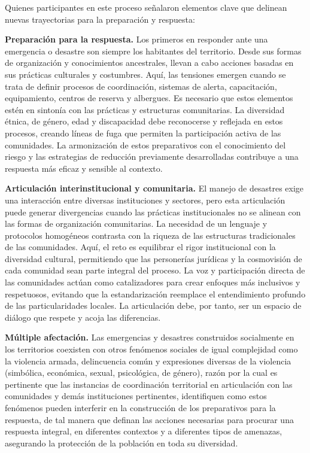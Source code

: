 \documentclass[
  spanish,
  letterpaper,
]{book}
\begin{document}
Quienes participantes en este proceso señalaron elementos clave que
delinean nuevas trayectorias para la preparación y respuesta:

\textbf{Preparación para la respuesta.} Los primeros en responder ante
una emergencia o desastre son siempre los habitantes del territorio.
Desde sus formas de organización y conocimientos ancestrales, llevan a
cabo acciones basadas en sus prácticas culturales y costumbres. Aquí,
las tensiones emergen cuando se trata de definir procesos de
coordinación, sistemas de alerta, capacitación, equipamiento, centros de
reserva y albergues. Es necesario que estos elementos estén en sintonía
con las prácticas y estructuras comunitarias. La diversidad étnica, de
género, edad y discapacidad debe reconocerse y reflejada en estos
procesos, creando líneas de fuga que permiten la participación activa de
las comunidades. La armonización de estos preparativos con el
conocimiento del riesgo y las estrategias de reducción previamente
desarrolladas contribuye a una respuesta más eficaz y sensible al
contexto.

\textbf{Articulación interinstitucional y comunitaria.} El manejo de
desastres exige una interacción entre diversas instituciones y sectores,
pero esta articulación puede generar divergencias cuando las prácticas
institucionales no se alinean con las formas de organización
comunitarias. La necesidad de un lenguaje y protocolos homogéneos
contrasta con la riqueza de las estructuras tradicionales de las
comunidades. Aquí, el reto es equilibrar el rigor institucional con la
diversidad cultural, permitiendo que las personerías jurídicas y la
cosmovisión de cada comunidad sean parte integral del proceso. La voz y
participación directa de las comunidades actúan como catalizadores para
crear enfoques más inclusivos y respetuosos, evitando que la
estandarización reemplace el entendimiento profundo de las
particularidades locales. La articulación debe, por tanto, ser un
espacio de diálogo que respete y acoja las diferencias.

\textbf{Múltiple afectación.} Las emergencias y desastres construidos
socialmente en los territorios coexisten con otros fenómenos sociales de
igual complejidad como la violencia armada, delincuencia común y
expresiones diversas de la violencia (simbólica, económica, sexual,
psicológica, de género), razón por la cual es pertinente que las
instancias de coordinación territorial en articulación con las
comunidades y demás instituciones pertinentes, identifiquen como estos
fenómenos pueden interferir en la construcción de los preparativos para
la respuesta, de tal manera que definan las acciones necesarias para
procurar una respuesta integral, en diferentes contextos y a diferentes
tipos de amenazas, asegurando la protección de la población en toda su
diversidad.
\end{document}
